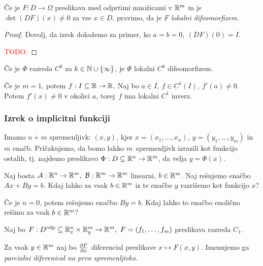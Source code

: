 \begin{definicija}
    Če je $F: D \to \Omega$ preslikava med odprtimi množicami v $\mathbb{R}^m$ in je $\det(DF)(x) \neq 0$ za vse $x \in D$, pravimo, da je $F$ \emph{lokalni difeomorfizem}.
\end{definicija}

\begin{proof}
    Dovolj, da izrek dokažemo za primer, ko $a=b=0, \ (DF)(0) = I$.

    \textcolor{red}{TODO.}
\end{proof}

\begin{posledica}
    Če je $\Phi$ razreda $C^k$ za $k \in \mathbb{N} \cup \left\{\infty\right\}$, je $\Phi$ lokalni $C^k$ difeomorfizem.
\end{posledica}

\begin{opomba}
    Če je $m=1$, potem $f: I \subseteq \mathbb{R} \to \mathbb{R}$. Naj bo $a \in I, \ f \in C^1(I), \ f'(a) \neq 0$. Potem $f'(x) \neq 0$ v okolici $a$, torej~$f$ ima lokalni $C^1$ inverz.
\end{opomba}







\newpage
\subsubsection{Izrek o implicitni funkciji}
Imamo $n+m$ spremenljivk: $(x, y)$, kjer $x = (x_1, \ldots, x_n), \ y = (y_1, \ldots, y_m)$ in $m$ enačb. Pričakujemo, da bomo lahko $m$~spremenljivk izrazili kot funkcijo ostalih, tj. najdemo preslikavo $\Phi: D \subseteq \mathbb{R}^n \to \mathbb{R}^m$, da velja $y = \Phi(x)$.


\begin{primer}
    Naj bosta $\lin{A}: \RR^n \to \RR^m, \ \lin{B}: \RR^m \to \RR^m$ linearni, $b \in \mathbb{R}^m$. Naj rešujemo enačbo $Ax + By = b$. Kdaj lahko za vsak $b \in \mathbb{R}^m$ iz te  enačbe $y$ razrišemo kot funkcijo $x$? 

    Če je $n=0$, potem rešujemo enačbo $By = b$. Kdaj lahko to enačbo enolično rešimo za vsak $b \in \mathbb{R}^m$?
\end{primer}

Naj bo $F: D^\text{odp} \subseteq \mathbb{R}^n_x \times \mathbb{R}^m_y \to \mathbb{R}^m, \ F = (f_1, \ldots, f_m)$ preslikava razreda $C_1$. 

Za vsak $y \in \mathbb{R}^m$ naj bo $\frac{\partial F}{\partial x}$ diferencial preslikave $x \mapsto F(x,y)$. Imenujemo ga \emph{parcialni diferenical na prvo spremenljivko}. 

